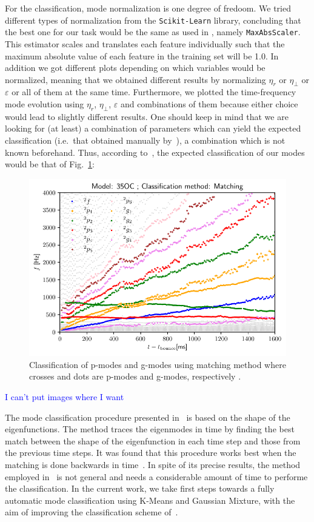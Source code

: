 \documentclass[fleqn,usenatbib]{mnras}
\begin{document}
For the classification, mode normalization is one degree of fredoom. We tried different types of normalization from the {\tt Scikit-Learn} library, concluding that the best one for our task would be the same as used in \cite{towards}, namely {\tt MaxAbsScaler}. This estimator scales and translates each feature individually such that the maximum absolute value of each feature in the training set will be 1.0. In addition we got different plots depending on which variables would be normalized, meaning that we obtained different results by normalizing $\eta_r$ or $\eta_\bot$ or $\varepsilon$ or all of them at the same time. Furthermore, we plotted the time-frequency mode evolution using $\eta_r$, $\eta_\bot$, $\varepsilon$ and combinations of them because either choice would lead to slightly different results. One should keep in mind that we are looking for (at least) a combination of parameters which can yield the expected classification (i.e.~that obtained manually by~\cite{towards,nocowling}), a combination which is not known beforehand. Thus, according to~\cite{nocowling}, the expected  classification of our modes would be that of Fig.~\ref{expected}:

\begin{figure}
    \centering
    \includegraphics[height=5 cm]{expected.pdf}
    \caption{\label{expected} Classification of p-modes and g-modes using matching method where crosses and dots are p-modes and g-modes,  respectively . }
\end{figure}

\textcolor{blue}{I can't put images where I want}

The mode classification procedure presented in~\cite{} is based on the shape of the eigenfunctions. The method traces the eigenmodes in time by finding the best match between the shape of the eigenfunction in each time step and those from the previous time steps. It was found that this procedure works best when the matching is done backwards in time~\cite{}. In spite of its precise results, the method employed in~\cite{} is not general and needs a considerable amount of time to performe the classification. In the current work, we take first steps towards a fully automatic mode classification using K-Means and Gaussian Mixture, with the aim of  improving the classification scheme of~\cite{}.
\end{document}
